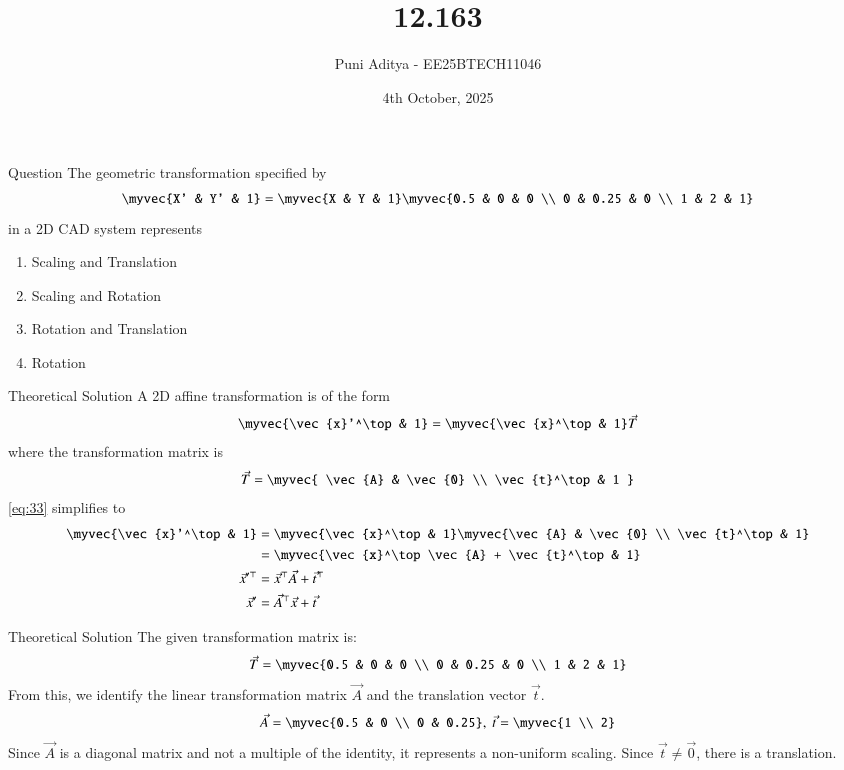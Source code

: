 \documentclass{beamer}
\title{12.163}
\date{4th October, 2025}
\author{Puni Aditya - EE25BTECH11046}
\begin{document}
\frame{\titlepage}
\begin{frame}{Question}
The geometric transformation specified by
\begin{align*}
    \myvec{X' & Y' & 1} = \myvec{X & Y & 1} \myvec{0.5 & 0 & 0 \\ 0 & 0.25 & 0 \\ 1 & 2 & 1}
\end{align*}
in a 2D CAD system represents
\begin{enumerate}
    \item[a)] Scaling and Translation
    \item[b)] Scaling and Rotation
    \item[c)] Rotation and Translation
    \item[d)] Rotation
\end{enumerate}
\end{frame}

\begin{frame}{Theoretical Solution}
A 2D affine transformation is of the form 
\begin{align}
\myvec{\vec{x}'^\top & 1} = \myvec{\vec{x}^\top & 1}\vec{T} \label{eq:33}
\end{align}
where the transformation matrix is
\begin{align*}
    \vec{T} = \myvec{
        \vec{A} & \vec{0} \\
        \vec{t}^\top & 1
    }
\end{align*}
\eqref{eq:33} simplifies to
\begin{align}
    \myvec{\vec{x}'^\top & 1} &= \myvec{\vec{x}^\top & 1}\myvec{\vec{A} & \vec{0} \\ \vec{t}^\top & 1} \\
    &= \myvec{\vec{x}^\top\vec{A} + \vec{t}^\top & 1} \\
    \vec{x}'^\top &= \vec{x}^\top\vec{A} + \vec{t}^\top \\
    \vec{x}' &= \vec{A}^\top\vec{x} + \vec{t} \label{eq:47}
\end{align}
\end{frame}

\begin{frame}{Theoretical Solution}
The given transformation matrix is:
\begin{align}
    \vec{T} = \myvec{0.5 & 0 & 0 \\ 0 & 0.25 & 0 \\ 1 & 2 & 1}
\end{align}
From this, we identify the linear transformation matrix $\vec{A}$ and the translation vector $\vec{t}$.
\begin{align}
    \vec{A} = \myvec{0.5 & 0 \\ 0 & 0.25}, \text{ } \vec{t} = \myvec{1 \\ 2}
\end{align}
Since $\vec{A}$ is a diagonal matrix and not a multiple of the identity, it represents a non-uniform scaling. Since $\vec{t} \neq \vec{0}$, there is a translation.
\end{frame}
\end{document}
